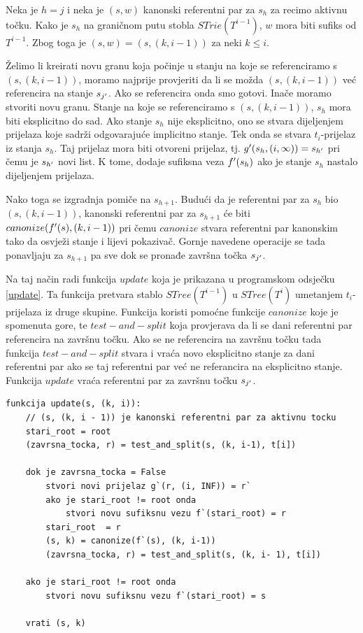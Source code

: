 \documentclass[times, utf8, seminar, numeric]{fer}
\begin{document}
	Neka je $h = j$ i neka je $(s, w)$ kanonski referentni par za $s_h$ za recimo aktivnu točku. Kako je $s_h$ na graničnom putu stobla $STrie(T^{i-1})$, $w$ mora biti sufiks od $T^{i-1}$. Zbog toga je $(s, w) = (s, (k, i - 1))$ za neki $k \le i$.
	
	Želimo li kreirati novu granu koja počinje u stanju na koje se referenciramo s $(s, (k, i-1))$, moramo najprije provjeriti da li se možda $(s, (k, i- 1))$ već referencira na stanje $s_{j\rq{}}$. Ako se referencira onda smo gotovi. Inače moramo stvoriti novu granu. Stanje na koje se referenciramo s $(s, (k, i-1))$, $s_h$ mora biti eksplicitno do sad. Ako stanje $s_h$ nije eksplicitno, ono se stvara dijeljenjem prijelaza koje sadrži odgovarajuće implicitno stanje. Tek onda se stvara $t_i$-prijelaz iz stanja $s_h$. Taj prijelaz mora biti otvoreni prijelaz, tj. $g\rq{}(s_h, (i, \infty)) = s_{h\rq{}}$ pri čemu je $s_{h\rq{}}$ novi list. K tome, dodaje sufiksna veza $f\rq{}(s_h)$ ako je stanje $s_h$ nastalo dijeljenjem prijelaza.
	
	Nako toga se izgradnja pomiče na $s_{h+1}$. Budući  da je referentni par za $s_h$ bio $(s, (k, i-1))$, kanonski referentni par za $s_{h+1}$ će biti $canonize(f\rq{}(s), (k, i-1))$ pri čemu $canonize$ stvara referentni par kanonskim tako da osvježi stanje i lijevi pokazivač. Gornje navedene operacije se tada ponavljaju za $s_{h+1}$ pa sve dok se pronađe završna točka $s_{j\rq{}}$.
	
	Na taj način radi funkcija $update$ koja je prikazana u programskom odsječku \ref{update}. Ta funkcija pretvara stablo $STree(T^{i-1})$ u $STree(T^i)$ umetanjem $t_i$-prijelaza iz druge skupine. Funkcija koristi pomoćne funkcije $canonize$ koje je spomenuta gore, te $test-and-split$ koja provjerava da li se dani referentni par referencira na završnu točku. Ako se ne referencira na završnu točku tada funkcija $test-and-split$ stvara i vraća novo eksplicitno stanje za dani referentni par ako se taj referentni par već ne referancira na eksplicitno stanje. Funkcija $update$ vraća referentni par za završnu točku $s_{j\rq{}}$.
	
	
\begin{lstlisting}[caption=Funkcija $update$, label=update]
funkcija update(s, (k, i)):
	// (s, (k, i - 1)) je kanonski referentni par za aktivnu tocku
	stari_root = root
	(zavrsna_tocka, r) = test_and_split(s, (k, i-1), t[i])
	
	dok je zavrsna_tocka = False
		stvori novi prijelaz g`(r, (i, INF)) = r` 
		ako je stari_root != root onda
			stvori novu sufiksnu vezu f`(stari_root) = r
		stari_root  = r
		(s, k) = canonize(f`(s), (k, i-1))
		(zavrsna_tocka, r) = test_and_split(s, (k, i- 1), t[i])
		
	ako je stari_root != root onda
		stvori novu sufiksnu vezu f`(stari_root) = s

	vrati (s, k)
\end{lstlisting}
\end{document}

